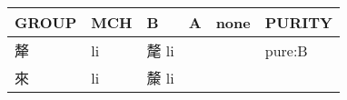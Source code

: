 \documentclass[14pt,a4paper]{scrartcl}
\begin{document}
\begin{longtable}[c]{@{}llllll@{}}
\toprule
\begin{minipage}[b]{0.14\columnwidth}\raggedright\strut
GROUP
\strut\end{minipage} &
\begin{minipage}[b]{0.14\columnwidth}\raggedright\strut
MCH
\strut\end{minipage} &
\begin{minipage}[b]{0.14\columnwidth}\raggedright\strut
B
\strut\end{minipage} &
\begin{minipage}[b]{0.14\columnwidth}\raggedright\strut
A
\strut\end{minipage} &
\begin{minipage}[b]{0.14\columnwidth}\raggedright\strut
none
\strut\end{minipage} &
\begin{minipage}[b]{0.14\columnwidth}\raggedright\strut
PURITY
\strut\end{minipage}\tabularnewline
\midrule
\endhead
\begin{minipage}[t]{0.14\columnwidth}\raggedright\strut
犛
\strut\end{minipage} &
\begin{minipage}[t]{0.14\columnwidth}\raggedright\strut
li
\strut\end{minipage} &
\begin{minipage}[t]{0.14\columnwidth}\raggedright\strut
氂 li
\strut\end{minipage} &
\begin{minipage}[t]{0.14\columnwidth}\raggedright\strut
\strut\end{minipage} &
\begin{minipage}[t]{0.14\columnwidth}\raggedright\strut
\strut\end{minipage} &
\begin{minipage}[t]{0.14\columnwidth}\raggedright\strut
pure:B
\strut\end{minipage}\tabularnewline
\begin{minipage}[t]{0.14\columnwidth}\raggedright\strut
來
\strut\end{minipage} &
\begin{minipage}[t]{0.14\columnwidth}\raggedright\strut
li
\strut\end{minipage} &
\begin{minipage}[t]{0.14\columnwidth}\raggedright\strut
斄 li
\strut\end{minipage} &
\begin{minipage}[t]{0.14\columnwidth}\raggedright\strut

\end{minipage}
\end{longtable}
\end{document}

